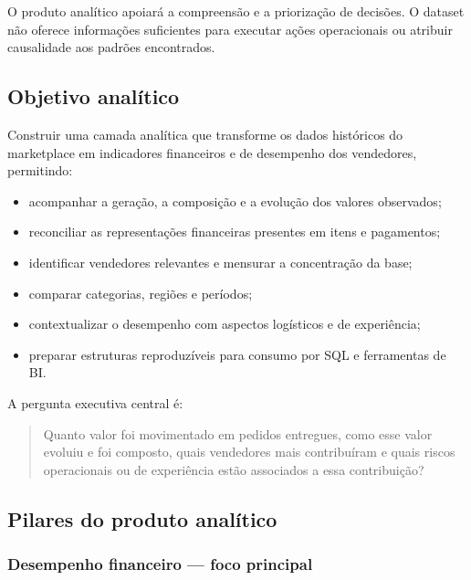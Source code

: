 \documentclass[12pt,a4paper]{article}
\providecommand{\tightlist}{
  \setlength{\itemsep}{0pt}\setlength{\parskip}{0pt}
}
\begin{document}
O produto analítico apoiará a compreensão e a priorização de decisões. O
dataset não oferece informações suficientes para executar ações
operacionais ou atribuir causalidade aos padrões encontrados.

\subsection{Objetivo
analítico}\label{docs__analytics__contrato_analitico.md__objetivo-analuxedtico}

Construir uma camada analítica que transforme os dados históricos do
marketplace em indicadores financeiros e de desempenho dos vendedores,
permitindo:

\begin{itemize}
\tightlist
\item
  acompanhar a geração, a composição e a evolução dos valores
  observados;
\item
  reconciliar as representações financeiras presentes em itens e
  pagamentos;
\item
  identificar vendedores relevantes e mensurar a concentração da base;
\item
  comparar categorias, regiões e períodos;
\item
  contextualizar o desempenho com aspectos logísticos e de experiência;
\item
  preparar estruturas reproduzíveis para consumo por SQL e ferramentas
  de BI.
\end{itemize}

A pergunta executiva central é:

\begin{quote}
Quanto valor foi movimentado em pedidos entregues, como esse valor
evoluiu e foi composto, quais vendedores mais contribuíram e quais
riscos operacionais ou de experiência estão associados a essa
contribuição?
\end{quote}

\subsection{Pilares do produto
analítico}\label{docs__analytics__contrato_analitico.md__pilares-do-produto-analuxedtico}

\subsubsection{Desempenho financeiro --- foco
principal}\label{docs__analytics__contrato_analitico.md__desempenho-financeiro-foco-principal}
\end{document}
